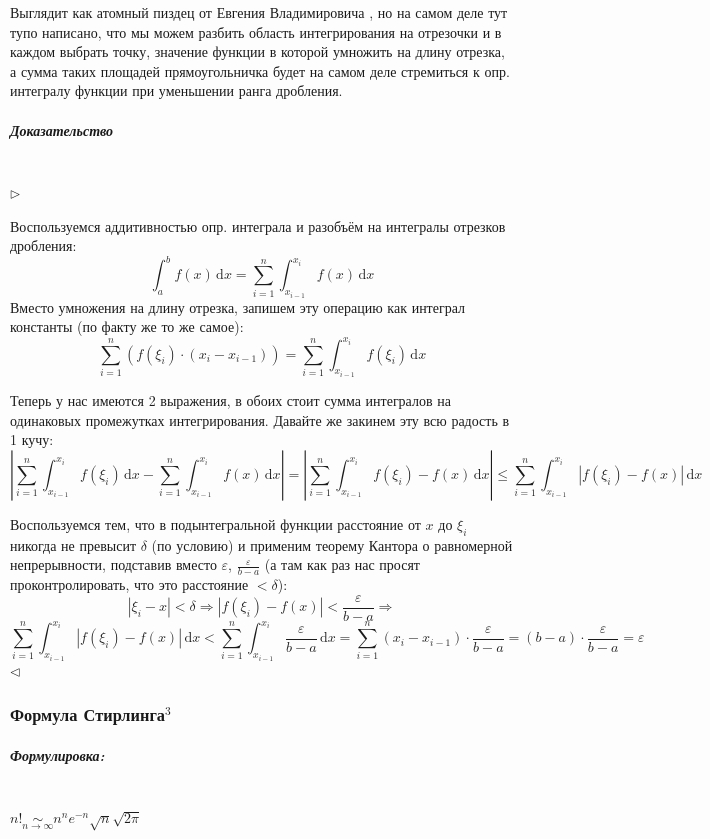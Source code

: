 \documentclass{article}
\def\D{\,\mathrm{d}}
\let\vanillasubparagraph\subparagraph
\renewcommand{\subparagraph}[1]{\vanillasubparagraph{#1}\mbox{}\\}
\begin{document}
Выглядит как атомный пиздец от Евгения Владимировича \Frowny, но на самом деле тут тупо написано, что мы можем разбить область интегрирования на отрезочки и в каждом выбрать точку, значение функции в которой умножить на длину отрезка, а сумма таких площадей прямоугольничка будет на самом деле стремиться к опр. интегралу функции при уменьшении ранга дробления. \Smiley

\subparagraph{Доказательство}
$\rhd$

Воспользуемся аддитивностью опр. интеграла и разобъём на интегралы отрезков дробления:
$$
\int_a^b f(x) \D x = \sum_{i=1}^n \int_{x_{i-1}}^{x_i} f(x) \D x
$$
Вместо умножения на длину отрезка, запишем эту операцию как интеграл константы (по факту же то же самое):
$$
\sum_{i=1}^n (f(\xi_i) \cdot (x_i - x_{i-1})) = \sum_{i=1}^n \int_{x_{i-1}}^{x_i} f(\xi_i) \D x
$$

Теперь у нас имеются 2 выражения, в обоих стоит сумма интегралов на одинаковых промежутках интегрирования. Давайте же закинем эту всю радость в 1 кучу:
$$
\left|\sum_{i=1}^n \int_{x_{i-1}}^{x_i} f(\xi_i) \D x  -   \sum_{i=1}^n\int_{x_{i-1}}^{x_i} f(x) \D x\right| = \left|\sum_{i=1}^n \int_{x_{i-1}}^{x_i} f(\xi_i) - f(x) \D x\right| \le \sum_{i=1}^n \int_{x_{i-1}}^{x_i} \left| f(\xi_i) - f(x) \right| \D x
$$

Воспользуемся тем, что в подынтегральной функции расстояние от $x$ до $\xi_i$ никогда не превысит $\delta$ (по условию) и применим теорему Кантора о равномерной непрерывности, подставив вместо $\varepsilon$, $\frac{\varepsilon}{b - a}$ (а там как раз нас просят проконтролировать, что это расстояние $< \delta$):
$$
|\xi_i - x| < \delta \Rightarrow \left| f(\xi_i) - f(x) \right| < \frac{\varepsilon}{b-a} \Rightarrow
$$
$$\sum_{i=1}^n \int_{x_{i-1}}^{x_i} \left| f(\xi_i) - f(x) \right| \D x < \sum_{i=1}^n \int_{x_{i-1}}^{x_i} \frac{\varepsilon}{b-a} \D x = \sum_{i=1}^n (x_i - x_{i-1}) \cdot \frac{\varepsilon}{b-a} = (b - a) \cdot \frac{\varepsilon}{b-a} = \varepsilon
$$
$\lhd$

\subsubsection{Формула Стирлинга\texorpdfstring{$^3$}{}}
\subparagraph{Формулировка:}

$n! \underset{n \rightarrow \infty}{\sim} n^ne^{-n}\sqrt{n}\sqrt{2\pi}$
\end{document}
